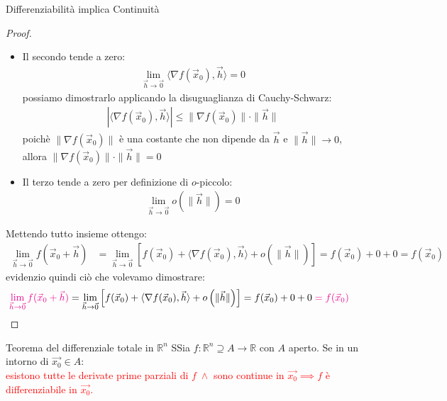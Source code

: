 \documentclass{article}  %
\begin{document}
\begin{theorem}{Differenziabilità implica Continuità}
\begin{proof}
\begin{itemize}
\begin{align*}
				      \lim_{\vec{h} \to \vec{0}} f(\vec{x}_0) = f(\vec{x}_0)
			      \end{align*}
			\item Il secondo tende a zero:
			      \begin{align*}
				      \lim_{\vec{h} \to \vec{0}} \langle \nabla f(\vec{x}_0), \vec{h} \rangle = 0
			      \end{align*}
			      possiamo dimostrarlo applicando la disuguaglianza di Cauchy-Schwarz:
			      \begin{align*}
				      |\langle \nabla f(\vec{x}_0), \vec{h} \rangle| \leq \| \nabla f(\vec{x}_0) \| \cdot \| \vec{h} \|
			      \end{align*}
			      poichè $\| \nabla f(\vec{x}_0) \|$ è una costante che non dipende da $\vec{h}$ e $\|\vec{h}\| \to 0$, allora $\| \nabla f(\vec{x}_0) \| \cdot \| \vec{h} \| = 0$
			\item Il terzo tende a zero per definizione di $o$-piccolo:
			      \begin{align*}
				      \lim_{\vec{h} \to \vec{0}} o \left( \| \vec{h} \|\right) = 0
			      \end{align*}
		\end{itemize}
		Mettendo tutto insieme ottengo:
		\begin{align*}
			\lim_{\vec{h} \to \vec{0}} f(\vec{x}_0 + \vec{h}) & = \lim_{\vec{h} \to \vec{0}} \left[f(\vec{x}_0)+ \langle \nabla f(\vec{x}_0), \vec{h} \rangle + o \left( \| \vec{h} \|\right) \right]  = f(\vec{x}_0) + 0 + 0 = f(\vec{x}_0)
		\end{align*}
		evidenzio quindi ciò che volevamo dimostrare:
		\begin{align*}
			\textcolor{magenta}{\lim_{\vec{h} \to \vec{0}} f(\vec{x}_0 + \vec{h})} & = \lim_{\vec{h} \to \vec{0}} \left[f(\vec{x}_0)+ \langle \nabla f(\vec{x}_0), \vec{h} \rangle + o \left( \| \vec{h} \|\right) \right]  = f(\vec{x}_0) + 0 + 0 \textcolor{magenta}{\;= f(\vec{x}_0)}
		\end{align*}
	\end{proof}
\end{theorem}

\begin{theorem}{Teorema del differenziale totale in $\mathbb{R}^n$}
	SSia $f: \mathbb{R}^n \supseteq A \to \mathbb{R}$ con $A$ aperto. Se in un intorno di $\vec{x_0} \in A$: \\
	\textcolor{red}{esistono tutte le derivate
		prime parziali di $f \; \land$  sono continue in $\vec{x_0} \implies f$ è differenziabile in $\vec{x_0}$.}
\end{theorem}
\end{document}
